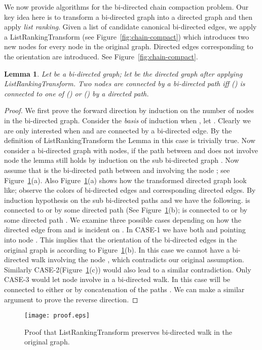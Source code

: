 \documentclass[11pt,conference,twocolumn]{IEEEtran}
\newtheorem{lemma}{Lemma}
\begin{document}
We now provide algorithms for the bi-directed chain compaction problem. Our key idea here is
to transform a bi-directed graph into a directed graph and then apply {\em list ranking}.
Given a list of candidate canonical bi-directed edges, we apply a {\sf ListRankingTransform}
(see Figure~\ref{fig:chain-compact}) which introduces two new nodes  for every node
 in the original graph. Directed edges corresponding to the orientation are introduced. See 
Figure~\ref{fig:chain-compact}. 
\begin{lemma}
\label{lem:bi-lemma}
Let  be a bi-directed graph; let  be the directed graph after applying
{\sf ListRankingTransform}. Two nodes  are connected by a bi-directed path iff 
 () is connected to one of () or () by a directed path. 
\end{lemma}
\begin{proof}
We first prove the forward direction by induction on the number of nodes in the bi-directed graph. 
Consider the {\em basis} of induction when , let . Clearly we are only interested
when  and  are connected by a bi-directed edge. By the definition of {\sf ListRankingTransform} 
the Lemma in this case is trivially true. Now consider a bi-directed graph with  nodes, if the
path between  and  does not involve node  the lemma still holds by induction on 
the sub bi-directed graph . Now assume that  is the 
bi-directed path between  and  involving the node ; see Figure~\ref{fig:proof}(a). 
Also Figure~\ref{fig:proof}(a) shows how the transformed directed graph look like; observe the colors of 
bi-directed edges and corresponding directed edges. By induction hypothesis on the sub bi-directed paths
 and  we have the following.  is connected to 
or  by some directed path  (See Figure~\ref{fig:proof}(b);  is connected to  
or  by some directed path . We examine three possible cases depending on how the directed edge 
from  and  is incident on . In {\sf CASE-1} we have both  and  pointing into
node . This implies that the orientation of the bi-directed edges in the original graph is
according to Figure~\ref{fig:proof}(b). In this case we cannot have a bi-directed walk involving the node
, which contradicts our original assumption. Similarly {\sf CASE-2}(Figure~\ref{fig:proof}(c)) would 
also lead to a similar contradiction. Only {\sf CASE-3} would let node  involve in a bi-directed walk.
In this case  will be connected to either  or  by concatenation of the paths .
 We can make a similar argument to prove the reverse direction.
\end{proof}
\begin{figure}
\begin{center}
\texttt{[image: proof.eps]}
\end{center}
\caption{Proof that {\sf ListRankingTransform} preserves bi-directed walk in the original graph.}
\label{fig:proof}
\end{figure}
\end{document}
